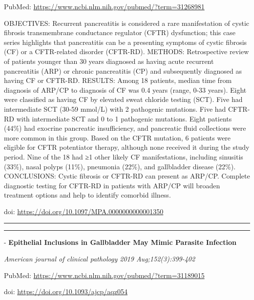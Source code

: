\documentclass[]{article}
\begin{document}
PubMed: \url{https://www.ncbi.nlm.nih.gov/pubmed/?term=31268981}

OBJECTIVES: Recurrent pancreatitis is considered a rare manifestation of
cystic fibrosis transmembrane conductance regulator (CFTR) dysfunction;
this case series highlights that pancreatitis can be a presenting
symptoms of cystic fibrosis (CF) or a CFTR-related disorder (CFTR-RD).
METHODS: Retrospective review of patients younger than 30 years
diagnosed as having acute recurrent pancreatitis (ARP) or chronic
pancreatitis (CP) and subsequently diagnosed as having CF or CFTR-RD.
RESULTS: Among 18 patients, median time from diagnosis of ARP/CP to
diagnosis of CF was 0.4 years (range, 0-33 years). Eight were classified
as having CF by elevated sweat chloride testing (SCT). Five had
intermediate SCT (30-59 mmol/L) with 2 pathogenic mutations. Five had
CFTR-RD with intermediate SCT and 0 to 1 pathogenic mutations. Eight
patients (44\%) had exocrine pancreatic insufficiency, and pancreatic
fluid collections were more common in this group. Based on the CFTR
mutation, 6 patients were eligible for CFTR potentiator therapy,
although none received it during the study period. Nine of the 18 had ≥1
other likely CF manifestations, including sinusitis (33\%), nasal polyps
(11\%), pneumonia (22\%), and gallbladder disease (22\%). CONCLUSIONS:
Cystic fibrosis or CFTR-RD can present as ARP/CP. Complete diagnostic
testing for CFTR-RD in patients with ARP/CP will broaden treatment
options and help to identify comorbid illness.

doi: \url{https://doi.org/10.1097/MPA.0000000000001350}

{}

{}

\begin{center}\rule{0.5\linewidth}{\linethickness}\end{center}

\begin{center}\rule{0.5\linewidth}{\linethickness}\end{center}

 - \textbf{Epithelial Inclusions in Gallbladder May Mimic Parasite
Infection}

\emph{American journal of clinical pathology 2019 Aug;152(3):399-402}

PubMed: \url{https://www.ncbi.nlm.nih.gov/pubmed/?term=31189015}

doi: \url{https://doi.org/10.1093/ajcp/aqz054}

{}

{}
\end{document}
